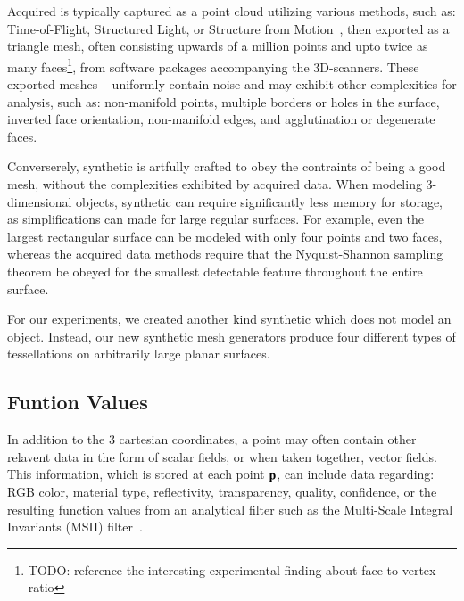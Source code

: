 Acquired \tdd{} is typically captured as a point cloud utilizing various methods, such as: Time-of-Flight, Structured Light, or Structure from Motion~\cite[p.~19]{Mara12}, then exported as a triangle mesh, often consisting upwards of a million points and upto twice as many faces\footnote{TODO: reference the interesting experimental finding about face to vertex ratio}, from software packages accompanying the 3D-scanners. These exported meshes ~\cite[p.~25]{Mara12} uniformly contain noise and may exhibit other complexities for analysis, such as: non-manifold points, multiple borders or holes in the surface, inverted face orientation, non-manifold edges, and agglutination or degenerate faces. ~\cite[p.~28-32]{Mara12}

Converserely, synthetic \tdd{} is artfully crafted to obey the contraints of being a good mesh, without the complexities exhibited by acquired data. When modeling 3-dimensional objects, synthetic \tdd{} can require significantly less memory for storage, as simplifications can made for large regular surfaces. For example, even the largest rectangular surface can be modeled with only four points and two faces, whereas the acquired data methods require that the Nyquist-Shannon sampling theorem be obeyed for the smallest detectable feature throughout the entire surface.

For our experiments, we created another kind synthetic \tdd{} which does not model an object. Instead, our new synthetic mesh generators produce four different types of tessellations on arbitrarily large planar surfaces.

%
\subsection{Funtion Values}
\label{chBsFV}
In addition to the 3 cartesian coordinates, a point may often contain other relavent data in the form of scalar fields, or when taken together, vector fields. This information, which is stored at each point $\mathbf{p}$, can include data regarding: RGB color, material type, reflectivity, transparency, quality, confidence, or the resulting function values from an analytical filter such as the Multi-Scale Integral Invariants (MSII) filter~\cite[p.~21]{Mara12}.

